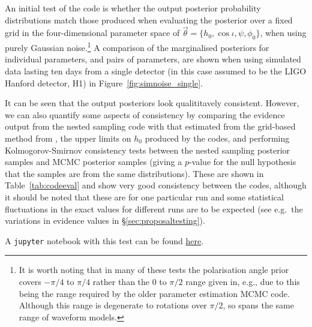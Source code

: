 An initial test of the code is whether the output posterior probability distributions match those produced when evaluating the
posterior over a fixed grid in the four-dimensional parameter space of $\vec{\theta} = \{h_0, \cos{\iota}, \psi, \phi_0\}$, when
using purely Gaussian noise.\footnote{It is worth noting that in many of these tests the polarisation angle prior covers $-\pi/4$ to $\pi/4$
rather than the 0 to $\pi/2$ range given in, e.g., \citet{2015MNRAS.453.4399P} due to this being the range required by the older
parameter estimation MCMC code. Although this range is degenerate to rotations over $\pi/2$, so spans the same range of waveform models.}
A comparison of the marginalised posteriors for individual parameters, and pairs of parameters, are shown when using simulated data lasting
ten days from a single detector (in this case assumed to be the LIGO Hanford detector, H1) in Figure~\ref{fig:simnoise_single}.

It can be seen that the output posteriors look qualititavely consistent. However, we can also quantify some aspects of consistency by
comparing the evidence output from the nested sampling code with that estimated from the grid-based method from \lppe, the upper limits
on $h_0$ produced by the codes, and performing Kolmogorov-Smirnov consistency tests between the nested sampling posterior samples
and MCMC posterior samples (giving a $p$-value for the null hypothesis that the samples are from the same distributions).
These are shown in Table~\ref{tab:codeeval} and show very good consistency between the codes, although it should be noted that
these are for one particular run and some statistical fluctuations in the exact values for different runs are to be expected (see e.g.\
the variations in evidence values in \S\ref{sec:proposaltesting}).

A {\tt jupyter} notebook with this test can be found \href{http://www.placeholder.com}{here}.

